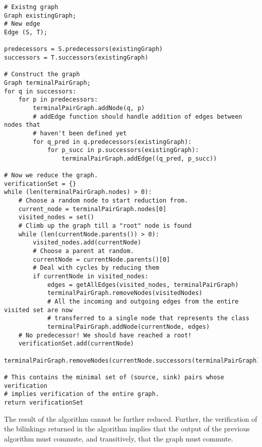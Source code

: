 \documentclass{article}
\begin{document}
\begin{verbatim}
# Existng graph
Graph existingGraph;
# New edge
Edge (S, T);

predecessors = S.predecessors(existingGraph)
successors = T.successors(existingGraph)

# Construct the graph
Graph terminalPairGraph;
for q in successors:
    for p in predecessors:
        terminalPairGraph.addNode(q, p)
        # addEdge function should handle addition of edges between nodes that 
        # haven't been defined yet
        for q_pred in q.predecessors(existingGraph):
            for p_succ in p.successors(existingGraph):
                terminalPairGraph.addEdge((q_pred, p_succ))

# Now we reduce the graph.
verificationSet = {}
while (len(terminalPairGraph.nodes) > 0):
    # Choose a random node to start reduction from.
    current_node = terminalPairGraph.nodes[0]
    visited_nodes = set()
    # Climb up the graph till a "root" node is found
    while (len(currentNode.parents()) > 0):
        visited_nodes.add(currentNode)
        # Choose a parent at random.
        currentNode = currentNode.parents()[0]
        # Deal with cycles by reducing them
        if currentNode in visited_nodes:
            edges = getAllEdges(visited_nodes, terminalPairGraph)
            terminalPairGraph.removeNodes(visitedNodes)
            # All the incoming and outgoing edges from the entire visited set are now 
            # transferred to a single node that represents the class
            terminalPairGraph.addNode(currentNode, edges)
    # No predecessor! We should have reached a root!
    verificationSet.add(currentNode)
    terminalPairGraph.removeNodes(currentNode.successors(terminalPairGraph)

# This contains the minimal set of (source, sink) pairs whose verification 
# implies verification of the entire graph. 
return verificationSet

\end{verbatim}

The result of the algorithm cannot be further reduced. Further, the verification of the bilinkings returned in the algorithm implies that the output of the previous algorithm must commute, and transitively, that the graph must commute.
\end{document}
